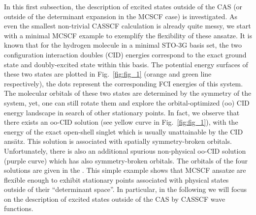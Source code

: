 \documentclass[aip,jcp,reprint,noshowkeys,superscriptaddress]{revtex4-1}
\begin{document}
In this first subsection, the description of excited states outside of the CAS (or outside of the determinant expansion in the MCSCF case) is investigated.
As even the smallest non-trivial CASSCF calculation is already quite messy, we start with a minimal MCSCF example to exemplify the flexibility of these ansatze.
It is known that for the hydrogen molecule in a minimal STO-3G basis set, \cite{Hehre_1969} the two configuration interaction doubles (CID) energies correspond to the exact ground state and doubly-excited state within this basis.
The potential energy surfaces of these two states are plotted in Fig.~\ref{fig:fig_1}  (orange and green line respectively), the dots represent the corresponding FCI energies of this system.
The molecular orbitals of these two states are determined by the symmetry of the system, yet, one can still rotate them and explore the orbital-optimized (oo) CID energy landscape in search of other stationary points.
In fact, we observe that there exists an oo-CID solution (see yellow curve in Fig.~\ref{fig:fig_1}), with the energy of the exact open-shell singlet which is usually unattainable by the CID ans\"atz.
This solution is associated with spatially symmetry-broken orbitals.
Unfortunately, there is also an additional spurious non-physical oo-CID solution (purple curve) which has also symmetry-broken orbitals.
The orbitals of the four solutions are given in the \SupInf.
This simple example shows that MCSCF ansatze are flexible enough to exhibit stationary points associated with physical states outside of their ``determinant space''.
In particular, in the following we will focus on the description of excited states outside of the CAS by CASSCF wave functions.
\end{document}
